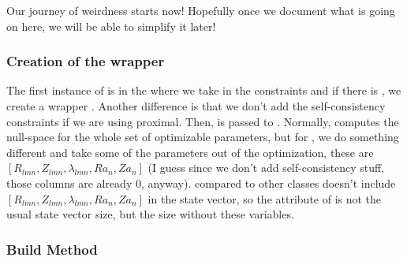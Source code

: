 Our journey of weirdness starts now! Hopefully once we document what is going on here, we will be able to simplify it later!

\subsubsection{Creation of the wrapper}

The first instance of  is in the  where we take in the constraints and if there is , we create a wrapper . Another difference is that we don't add the self-consistency constraints if we are using proximal. Then,  is passed to . Normally,  computes the null-space for the whole set of optimizable parameters, but for , we do something different and take some of the parameters out of the optimization, these are $[R_{lmn}, Z_{lmn}, \lambda_{lmn}, Ra_n, Za_n]$ (I guess since we don't add self-consistency stuff, those columns are already 0, anyway).  compared to other  classes doesn't include $[R_{lmn}, Z_{lmn}, \lambda_{lmn}, Ra_n, Za_n]$ in the state vector, so the  attribute of  is not the usual state vector size, but the size without these variables.

\subsubsection{Build Method}

